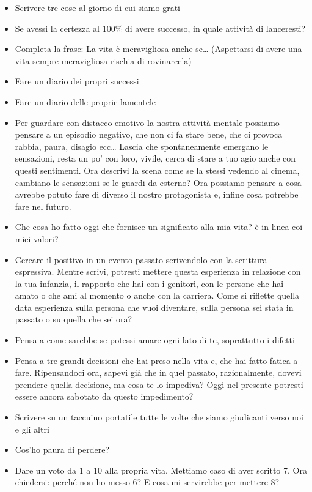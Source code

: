 \documentclass[12pt]{book} %
\begin{document}
\begin{itemize}
\item Scrivere tre cose al giorno di cui siamo grati
\item Se avessi la certezza al 100\% di avere successo, in quale attività di lanceresti?
\item Completa la frase: La vita è meravigliosa anche se… (Aspettarsi di avere una vita sempre meravigliosa rischia di rovinarcela)
\item Fare un diario dei propri successi 
\item Fare un diario delle proprie lamentele 
\item Per guardare con distacco emotivo la nostra attività mentale possiamo pensare a un episodio negativo, che non ci fa stare bene, che ci provoca rabbia, paura, disagio ecc… Lascia che spontaneamente emergano le sensazioni, resta un po' con loro, vivile, cerca di stare a tuo agio anche con questi sentimenti. Ora descrivi la scena come se la stessi vedendo al cinema, cambiano le sensazioni se le guardi da esterno? Ora possiamo pensare a cosa avrebbe potuto fare di diverso il nostro protagonista e, infine cosa potrebbe fare nel futuro.
\item Che cosa ho fatto oggi che fornisce un significato alla mia vita? è in linea coi miei valori? 
\item Cercare il positivo in un evento passato scrivendolo con la scrittura espressiva. Mentre scrivi, potresti mettere
questa esperienza in relazione con la tua infanzia, il rapporto che hai con i genitori, con le persone che hai amato o
che ami al momento o anche con la carriera. Come si riflette quella data esperienza sulla persona che vuoi diventare,
sulla persona sei stata in passato o su quella che sei ora?
\item Pensa a come sarebbe se potessi amare ogni lato di te, soprattutto i difetti
\item Pensa a tre grandi decisioni che hai preso nella vita e, che hai fatto fatica a fare. Ripensandoci ora, sapevi già
che in quel passato, razionalmente, dovevi prendere quella decisione, ma cosa te lo impediva? Oggi nel presente
potresti essere ancora sabotato da questo impedimento?
\item Scrivere su un taccuino portatile tutte le volte che siamo giudicanti verso noi e gli altri
\item Cos'ho paura di perdere?
\item Dare un voto da 1 a 10 alla propria vita. Mettiamo caso di aver scritto 7. Ora chiedersi: perché non ho messo 6? E cosa mi servirebbe per mettere 8? 
\end{itemize}
\end{document}
